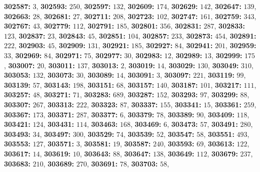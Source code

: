 \textsf{\bfseries 302587:} $3$, \textsf{\bfseries 302593:} $250$, \textsf{\bfseries 302597:} $132$, \textsf{\bfseries 302609:} $174$, \textsf{\bfseries 302629:} $142$, \textsf{\bfseries 302647:} $139$, \textsf{\bfseries 302663:} $28$, \textsf{\bfseries 302681:} $27$, \textsf{\bfseries 302711:} $208$, \textsf{\bfseries 302723:} $102$, \textsf{\bfseries 302747:} $161$, \textsf{\bfseries 302759:} $343$, \textsf{\bfseries 302767:} $43$, \textsf{\bfseries 302779:} $112$, \textsf{\bfseries 302791:} $185$, \textsf{\bfseries 302801:} $356$, \textsf{\bfseries 302831:} $287$, \textsf{\bfseries 302833:} $123$, \textsf{\bfseries 302837:} $23$, \textsf{\bfseries 302843:} $45$, \textsf{\bfseries 302851:} $104$, \textsf{\bfseries 302857:} $233$, \textsf{\bfseries 302873:} $454$, \textsf{\bfseries 302891:} $222$, \textsf{\bfseries 302903:} $45$, \textsf{\bfseries 302909:} $131$, \textsf{\bfseries 302921:} $185$, \textsf{\bfseries 302927:} $84$, \textsf{\bfseries 302941:} $201$, \textsf{\bfseries 302959:} $33$, \textsf{\bfseries 302969:} $84$, \textsf{\bfseries 302971:} $75$, \textsf{\bfseries 302977:} $30$, \textsf{\bfseries 302983:} $12$, \textsf{\bfseries 302989:} $13$, \textsf{\bfseries 302999:} $175$, \textsf{\bfseries 303007:} $20$, \textsf{\bfseries 303011:} $137$, \textsf{\bfseries 303013:} $2$, \textsf{\bfseries 303019:} $14$, \textsf{\bfseries 303029:} $130$, \textsf{\bfseries 303049:} $310$, \textsf{\bfseries 303053:} $132$, \textsf{\bfseries 303073:} $30$, \textsf{\bfseries 303089:} $14$, \textsf{\bfseries 303091:} $3$, \textsf{\bfseries 303097:} $221$, \textsf{\bfseries 303119:} $99$, \textsf{\bfseries 303139:} $57$, \textsf{\bfseries 303143:} $198$, \textsf{\bfseries 303151:} $68$, \textsf{\bfseries 303157:} $140$, \textsf{\bfseries 303187:} $101$, \textsf{\bfseries 303217:} $111$, \textsf{\bfseries 303257:} $48$, \textsf{\bfseries 303271:} $71$, \textsf{\bfseries 303283:} $689$, \textsf{\bfseries 303287:} $152$, \textsf{\bfseries 303293:} $97$, \textsf{\bfseries 303299:} $88$, \textsf{\bfseries 303307:} $267$, \textsf{\bfseries 303313:} $222$, \textsf{\bfseries 303323:} $87$, \textsf{\bfseries 303337:} $155$, \textsf{\bfseries 303341:} $15$, \textsf{\bfseries 303361:} $259$, \textsf{\bfseries 303367:} $173$, \textsf{\bfseries 303371:} $287$, \textsf{\bfseries 303377:} $6$, \textsf{\bfseries 303379:} $78$, \textsf{\bfseries 303389:} $90$, \textsf{\bfseries 303409:} $118$, \textsf{\bfseries 303421:} $124$, \textsf{\bfseries 303431:} $114$, \textsf{\bfseries 303463:} $168$, \textsf{\bfseries 303469:} $6$, \textsf{\bfseries 303473:} $57$, \textsf{\bfseries 303491:} $280$, \textsf{\bfseries 303493:} $34$, \textsf{\bfseries 303497:} $300$, \textsf{\bfseries 303529:} $74$, \textsf{\bfseries 303539:} $52$, \textsf{\bfseries 303547:} $58$, \textsf{\bfseries 303551:} $493$, \textsf{\bfseries 303553:} $127$, \textsf{\bfseries 303571:} $3$, \textsf{\bfseries 303581:} $19$, \textsf{\bfseries 303587:} $240$, \textsf{\bfseries 303593:} $69$, \textsf{\bfseries 303613:} $122$, \textsf{\bfseries 303617:} $14$, \textsf{\bfseries 303619:} $10$, \textsf{\bfseries 303643:} $88$, \textsf{\bfseries 303647:} $138$, \textsf{\bfseries 303649:} $112$, \textsf{\bfseries 303679:} $237$, \textsf{\bfseries 303683:} $210$, \textsf{\bfseries 303689:} $270$, \textsf{\bfseries 303691:} $78$, \textsf{\bfseries 303703:} $58$, 
